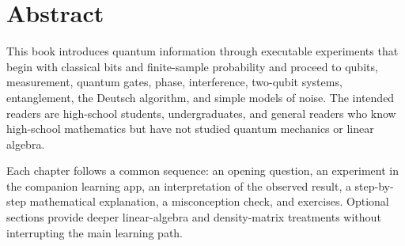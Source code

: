 \chapter*{Abstract}

This book introduces quantum information through executable experiments that begin
with classical bits and finite-sample probability and proceed to qubits, measurement,
quantum gates, phase, interference, two-qubit systems, entanglement, the Deutsch
algorithm, and simple models of noise. The intended readers are high-school students,
undergraduates, and general readers who know high-school mathematics but have not
studied quantum mechanics or linear algebra.

Each chapter follows a common sequence: an opening question, an experiment in the
companion learning app, an interpretation of the observed result, a step-by-step
mathematical explanation, a misconception check, and exercises. Optional sections
provide deeper linear-algebra and density-matrix treatments without interrupting the
main learning path.

